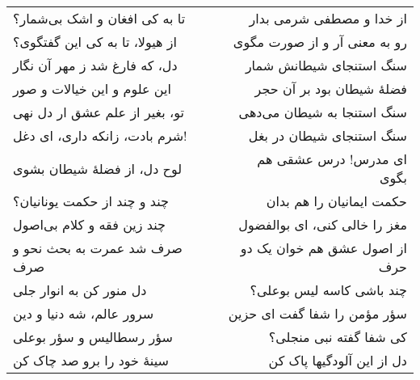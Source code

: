 \begin{center}
\begin{longtable}{l p{0.5cm} r}
\\
تا به کی افغان و اشک بی‌شمار؟
&&
از خدا و مصطفی شرمی بدار
\\
از هیولا، تا به کی این گفتگوی؟
&&
رو به معنی آر و از صورت مگوی
\\
دل، که فارغ شد ز مهر آن نگار
&&
سنگ استنجای شیطانش شمار
\\
این علوم و این خیالات و صور
&&
فضلهٔ شیطان بود بر آن حجر
\\
تو، بغیر از علم عشق ار دل نهی
&&
سنگ استنجا به شیطان می‌دهی
\\
شرم بادت، زانکه داری، ای دغل!
&&
سنگ استنجای شیطان در بغل
\\
لوح دل، از فضلهٔ شیطان بشوی
&&
ای مدرس! درس عشقی هم بگوی
\\
چند و چند از حکمت یونانیان؟
&&
حکمت ایمانیان را هم بدان
\\
چند زین فقه و کلام بی‌اصول
&&
مغز را خالی کنی، ای بوالفضول
\\
صرف شد عمرت به بحث نحو و صرف
&&
از اصول عشق هم خوان یک دو حرف
\\
دل منور کن به انوار جلی
&&
چند باشی کاسه لیس بوعلی؟
\\
سرور عالم، شه دنیا و دین
&&
سؤر مؤمن را شفا گفت ای حزین
\\
سؤر رسطالیس و سؤر بوعلی
&&
کی شفا گفته نبی منجلی؟
\\
سینهٔ خود را برو صد چاک کن
&&
دل از این آلودگیها پاک کن
\\
\end{longtable}
\end{center}
